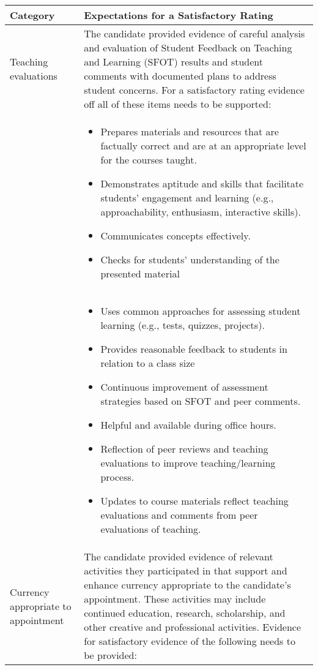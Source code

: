 \documentclass{scrartcl}
\begin{document}
\begin{longtable}{p{3cm}p{11cm}}

\hline
\textbf{Category} & \textbf{Expectations for a Satisfactory Rating} \\
\hline
\endhead %
Teaching evaluations & The candidate provided evidence of careful analysis and evaluation of Student Feedback on Teaching and Learning (SFOT) results and student comments with documented plans to address student concerns. For a satisfactory rating evidence off all of these items needs to be supported:  \\
& 	\begin{itemize}[noitemsep,leftmargin=*,topsep=0pt,partopsep=0pt]
    \item Prepares materials and resources that are factually correct and are at an appropriate level for the courses taught.
    \item Demonstrates aptitude and skills that facilitate students’ engagement and learning (e.g., approachability, enthusiasm, interactive skills).
     \item Communicates concepts effectively.
      \item Checks for students’ understanding of the presented material
     \end{itemize} \\
     & \begin{itemize}[noitemsep,leftmargin=*,topsep=0pt,partopsep=0pt]
       \item Uses common approaches for assessing student learning (e.g., tests, quizzes, projects).
        \item Provides reasonable feedback to students in relation to a class size
         \item Continuous improvement of assessment strategies based on SFOT and peer comments.
          \item Helpful and available during office hours.
           \item Reflection of peer reviews and teaching evaluations to improve teaching/learning process.
            \item Updates to course materials reflect teaching evaluations and comments from peer evaluations of teaching.
	\end{itemize}
	\\ \hline
Currency appropriate to appointment & The candidate provided evidence of relevant activities they participated in that support and enhance currency appropriate to the candidate’s appointment. These activities may include continued education, research, scholarship, and other creative and professional activities. Evidence for satisfactory evidence of the following needs to be provided: \\

\end{longtable}
\end{document}
